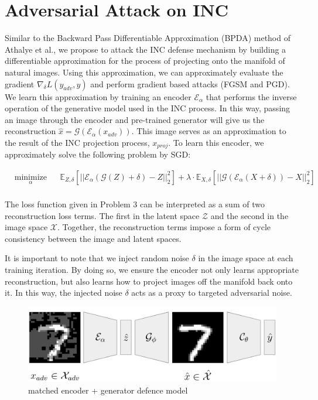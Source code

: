 \documentclass{article}
\theoremstyle{definition}
\begin{document}
\section{Adversarial Attack on INC}
Similar to the Backward Pass Differentiable Approximation (BPDA) method of Athalye et al., we propose to attack the INC defense mechanism by building a differentiable approximation for the process of projecting onto the manifold of natural images. Using this approximation, we can approximately evaluate the gradient $\nabla_{\delta} L(y_{adv},y) $ and perform gradient based attacks (FGSM and PGD). We learn this approximation by training an encoder  $\mathcal{E}_{\alpha}$ that performs the inverse operation of the generative model used in the INC process. In this way, passing an image through the encoder and pre-trained generator will give us the reconstruction $\hat{x} = \mathcal{G}(\mathcal{E}_{\alpha}(x_{adv}))$. This image serves as an approximation to the result of the INC projection process, $x_{proj}$. To learn this encoder, we approximately solve the following problem by SGD:

\begin{problem}
    \begin{equation*}
    \begin{aligned}
    & \underset{\alpha}{\text{minimize}}
    & & \mathbb{E}_{Z, \delta} [||\mathcal{E}_{\alpha}(\mathcal{G}(Z) + \delta) - Z||_2^2]
    + \lambda \cdot \mathbb{E}_{X, \delta} [||\mathcal{G}(\mathcal{E}_{\alpha}(X + \delta)) - X||_2^2]\\
    \end{aligned}
    \end{equation*}
\end{problem}

The loss function given in Problem 3 can be interpreted as a sum of two reconstruction loss terms. The first in the latent space $\mathcal{Z}$ and the second in the image space $\mathcal{X}$. Together, the reconstruction terms impose a form of cycle consistency between the image and latent spaces. 

It is important to note that we inject random noise $\delta$ in the image space at each training iteration. By doing so, we ensure the encoder not only learns appropriate reconstruction, but also learns how to project images off the manifold back onto it. In this way, the injected noise $\delta$ acts as a proxy to targeted adversarial noise. 

\begin{figure}[H]
\label{fig:reconstr}
    \caption{matched encoder + generator defence model}
\begin{center}
    \includegraphics[scale=0.3]{./INC.png}
\end{center}
\end{figure}
\end{document}
